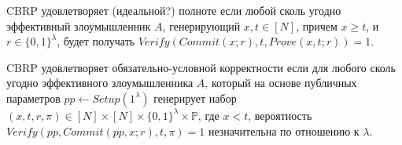 \documentclass[a4paper]{article}
\renewcommand{\P}{\mathbb{P}}
\begin{document}
	CBRP удовлетворяет (идеальной?) полноте если любой сколь угодно эффективный злоумышленник $A$, генерирующий $x, t \in [N]$, причем  $x \geq t$, и $r \in \{0, 1\}^\lambda$, будет получать $Verify(Commit(x; r), t, Prove(x, t; r)) = 1$.

	CBRP удовлетворяет обязательно-условной корректности если для любого сколь угодно эффективного злоумышленника $A$, который на основе публичных параметров $pp \leftarrow Setup(1^\lambda)$ генерирует набор $(x, t, r, \pi) \in [N] \times [N] \times \{0, 1\}^\lambda \times \P$, где $x < t$, вероятность $Verify(pp, Commit(pp, x; r), t, \pi) = 1$ незначительна по отношению к $\lambda$.

	
	
\end{document}
